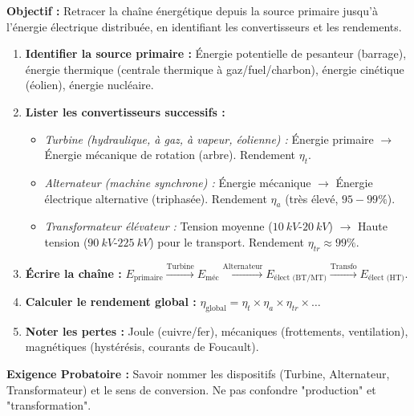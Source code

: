 \documentclass[11pt]{article}
\begin{document}
\begin{methode}
    \textbf{Objectif :} Retracer la chaîne énergétique depuis la source primaire jusqu'à l'énergie électrique distribuée, en identifiant les convertisseurs et les rendements.
    \begin{enumerate}
        \item \textbf{Identifier la source primaire :} Énergie potentielle de pesanteur (barrage), énergie thermique (centrale thermique à gaz/fuel/charbon), énergie cinétique (éolien), énergie nucléaire.
        \item \textbf{Lister les convertisseurs successifs :}
        \begin{itemize}
            \item \emph{Turbine (hydraulique, à gaz, à vapeur, éolienne) :} Énergie primaire $\to$ Énergie mécanique de rotation (arbre). Rendement $\eta_t$.
            \item \emph{Alternateur (machine synchrone) :} Énergie mécanique $\to$ Énergie électrique alternative (triphasée). Rendement $\eta_a$ (très élevé, $95-99\%$).
            \item \emph{Transformateur élévateur :} Tension moyenne ($\SI{10}{kV}$-$\SI{20}{kV}$) $\to$ Haute tension ($\SI{90}{kV}$-$\SI{225}{kV}$) pour le transport. Rendement $\eta_{tr} \approx 99\%$.
        \end{itemize}
        \item \textbf{Écrire la chaîne :} $E_{\text{primaire}} \xrightarrow{\text{Turbine}} E_{\text{méc}} \xrightarrow{\text{Alternateur}} E_{\text{élect (BT/MT)}} \xrightarrow{\text{Transfo}} E_{\text{élect (HT)}}$.
        \item \textbf{Calculer le rendement global :} $\eta_{\text{global}} = \eta_t \times \eta_a \times \eta_{tr} \times \dots$
        \item \textbf{Noter les pertes :} Joule (cuivre/fer), mécaniques (frottements, ventilation), magnétiques (hystérésis, courants de Foucault).
    \end{enumerate}
    \textbf{Exigence Probatoire :} Savoir nommer les dispositifs (Turbine, Alternateur, Transformateur) et le sens de conversion. Ne pas confondre "production" et "transformation".
\end{methode}
\end{document}
